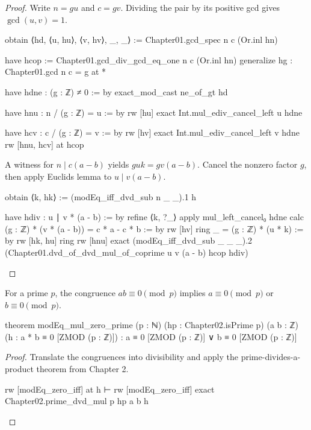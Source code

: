 \begin{proof}
  Write $n=gu$ and $c=gv$.
  Dividing the pair by its positive gcd gives $\gcd(u,v)=1$.

  \begin{lean}
    obtain ⟨hd, ⟨u, hu⟩, ⟨v, hv⟩, _, _⟩ := Chapter01.gcd_spec n c (Or.inl hn)

    have hcop := Chapter01.gcd_div_gcd_eq_one n c (Or.inl hn)
    generalize hg : Chapter01.gcd n c = g at *

    have hdne : (g : ℤ) ≠ 0 := by
      exact_mod_cast ne_of_gt hd

    have hnu : n / (g : ℤ) = u := by
      rw [hu]
      exact Int.mul_ediv_cancel_left u hdne

    have hcv : c / (g : ℤ) = v := by
      rw [hv]
      exact Int.mul_ediv_cancel_left v hdne
    rw [hnu, hcv] at hcop
  \end{lean}

  A witness for $n\mid c(a-b)$ yields $gu k=gv(a-b)$.
  Cancel the nonzero factor $g$, then apply Euclid\textquotesingle s lemma to $u\mid v(a-b)$.

  \begin{lean}
    obtain ⟨k, hk⟩ := (modEq_iff_dvd_sub n _ _).1 h

    have hdiv : u ∣ v * (a - b) := by
      refine ⟨k, ?_⟩
      apply mul_left_cancel₀ hdne
      calc
        (g : ℤ) * (v * (a - b)) = c * a - c * b := by
          rw [hv]
          ring
        _ = (g : ℤ) * (u * k) := by
          rw [hk, hu]
          ring
    rw [hnu]
    exact (modEq_iff_dvd_sub _ _ _).2
      (Chapter01.dvd_of_dvd_mul_of_coprime u v (a - b) hcop hdiv)
  \end{lean}
\end{proof}

\begin{theorem}
  \label{ent:thm:modeq-mul-zero-prime}
  For a prime $p$, the congruence $ab\equiv0\pmod p$ implies $a\equiv0\pmod p$ or $b\equiv0\pmod
    p$.

  \begin{lean}
    theorem modEq_mul_zero_prime (p : ℕ) (hp : Chapter02.isPrime p) (a b : ℤ)
        (h : a * b ≡ 0 [ZMOD (p : ℤ)]) :
        a ≡ 0 [ZMOD (p : ℤ)] ∨ b ≡ 0 [ZMOD (p : ℤ)]
  \end{lean}
\end{theorem}

\begin{proof}
  Translate the congruences into divisibility and apply the prime-divides-a-product theorem from
  Chapter 2.

  \begin{lean}
    rw [modEq_zero_iff] at h ⊢
    rw [modEq_zero_iff]
    exact Chapter02.prime_dvd_mul p hp a b h
  \end{lean}
\end{proof}
